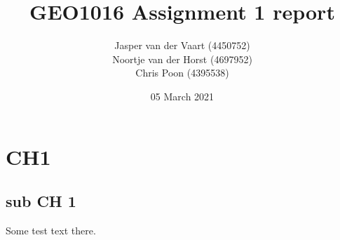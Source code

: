 \documentclass{report}
\title{GEO1016 Assignment 1 report}
\author{Jasper van der Vaart (4450752)\\Noortje van der Horst (4697952)\\Chris Poon (4395538)}
\date{05 March 2021}
\begin{document}
	
\maketitle
	
\section{CH1}

\subsection{sub CH 1}

Some test text there.
\end{document}

